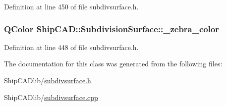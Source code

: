 Definition at line 450 of file subdivsurface.\+h.

\subsubsection[{\texorpdfstring{\+\_\+zebra\+\_\+color}{_zebra_color}}]{\setlength{\rightskip}{0pt plus 5cm}Q\+Color Ship\+C\+A\+D\+::\+Subdivision\+Surface\+::\+\_\+zebra\+\_\+color\hspace{0.3cm}{\ttfamily [protected]}}\hypertarget{classShipCAD_1_1SubdivisionSurface_a047d5d0575c944d216ada589e30ee3bd}{}\label{classShipCAD_1_1SubdivisionSurface_a047d5d0575c944d216ada589e30ee3bd}


Definition at line 448 of file subdivsurface.\+h.



The documentation for this class was generated from the following files\+:\begin{DoxyCompactItemize}
\item 
Ship\+C\+A\+Dlib/\hyperlink{subdivsurface_8h}{subdivsurface.\+h}\item 
Ship\+C\+A\+Dlib/\hyperlink{subdivsurface_8cpp}{subdivsurface.\+cpp}\end{DoxyCompactItemize}
